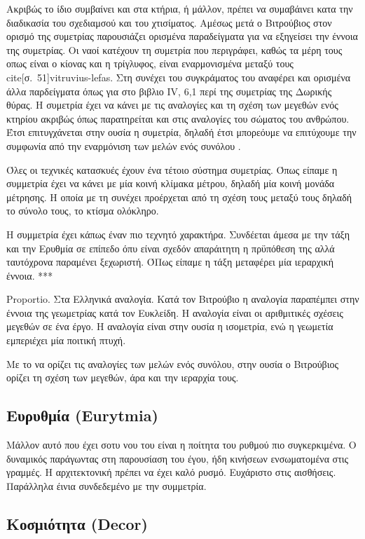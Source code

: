 Ακριβώς το ίδιο συμβαίνει και στα κτήρια, ή μάλλον, πρέπει να συμαβάινει κατα την διαδικασία του σχεδιαμσού και του χτισίματος. Αμέσως μετά ο Βιτρούβιος στον ορισμό της συμετρίας παρουσιάζει ορισμένα παραδείγματα για να εξηγείσει την έννοια της συμετρίας. Οι ναοί κατέχουν τη συμετρία που περιγράφει, καθώς τα μέρη τους οπως είναι ο κίονας και η τρίγλυφος, είναι εναρμονισμένα μεταξύ τους cite[σ.~51]{vitruvius-lefas}. Στη συνέχει του συγκράματος του αναφέρει και ορισμένα άλλα παρδείγματα όπως για στο βιβλιο IV, 6,1 περί της συμετρίας της Δωρικής θύρας. Η συμετρία έχει να κάνει με τις αναλογίες και τη σχέση των μεγεθών ενός κτηρίου ακριβώς όπως παρατηρείται και στις αναλογίες του σώματος του ανθρώπου. Έτσι επιτυγχάνεται στην ουσία η συμετρία, δηλαδή έτσι μπορεόυμε να επιτύχουμε την συμφωνία από την εναρμόνιση των μελών ενός συνόλου \cite[σ.~187]{lefas-fundamental}.

Όλες οι τεχνικές κατασκυές έχουν ένα τέτοιο σύστημα συμετρίας. Όπως είπαμε η συμμετρία έχει να κάνει με μία κοινή κλίμακα μέτρου, δηλαδή μία κοινή μονάδα μέτρησης. Η οποία με τη συνέχει προέρχεται από τη σχέση τους μεταξύ τους δηλαδή το σύνολο τους, το κτίσμα ολόκληρο.

Η συμμετρία έχει κάπως έναν πιο τεχνητό χαρακτήρα. Συνδέεται άμεσα με την τάξη και την Ερυθμία σε επίπεδο όπυ είναι σχεδόν απαράιτητη η πρϋπόθεση της αλλά ταυτόχρονα παραμένει ξεχωριστή. ΌΠως είπαμε η τάξη μεταφέρει μία ιεραρχική έννοια. ***

Proportio. Στα Ελληνικά αναλογία. Κατά τον Βιτρούβιο η αναλογία παραπέμπει στην έννοια της γεωμετρίας κατά τον Ευκλείδη. Η αναλογία είναι οι αριθμιτικές σχέσεις μεγεθών σε ένα έργο. Η αναλογία είναι στην ουσία η ισομετρία, ενώ η γεωμετία εμπεριέχει μία ποιτική πτυχή.

Με το να ορίζει τις αναλογίες των μελών ενός συνόλου, στην ουσία ο Βιτρούβιος ορίζει τη σχέση των μεγεθών, άρα και την ιεραρχία τους.
  
  \subsection{Ευρυθμία (Eurytmia)}
  
  Μάλλον αυτό που έχει σοτυ νου του είναι η ποίτητα του ρυθμού πιο συγκερκιμένα. Ο δυναμικός παράγωντας στη παρουσίαση του έγου, ήδη κινήσεων ενσωματομένα στις γραμμές. Η αρχιτεκτονική πρέπει να έχει καλό ρυσμό. Ευχάριστο στις αισθήσεις. Παράλληλα έινια συνδεδεμένο με την  συμμετρία.
  
  \subsection{Κοσμιότητα (Decor)}
  
